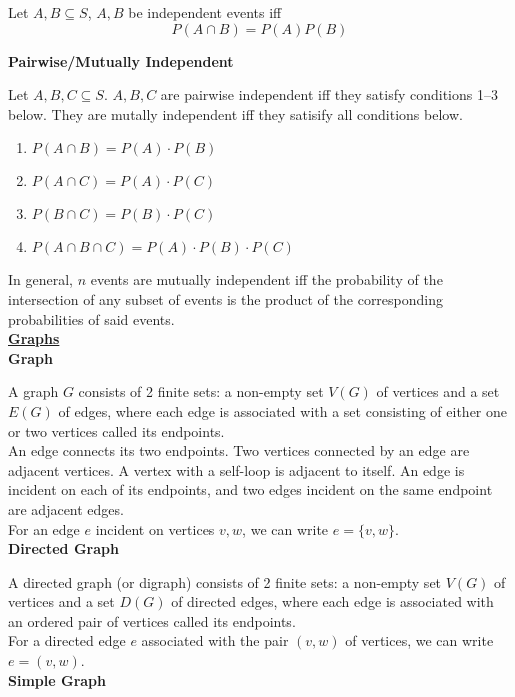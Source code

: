 \documentclass[a4paper]{article}
\newcommand{\heading}[1]{{\small\underline{\textbf{#1}}}}
\newcommand{\subheading}[1]{{\scriptsize\textbf{#1}}}
\begin{document}
\begin{multicols*}{4}
Let $A, B \subseteq S$, $A, B$ be independent events iff 
$$P(A \cap B) = P(A)P(B)$$

\subheading{Pairwise/Mutually Independent}

Let $A, B, C \subseteq S$. $A, B, C$ are pairwise independent iff they satisfy
conditions 1--3 below. They are mutally independent iff they satisify all
conditions below.
\begin{enumerate} \itemsep -0.5em
  \item $P(A \cap B) = P(A) \cdot P(B)$
  \item $P(A \cap C) = P(A) \cdot P(C)$
  \item $P(B \cap C) = P(B) \cdot P(C)$
  \item $P(A \cap B \cap C) = P(A) \cdot P(B) \cdot P(C)$
\end{enumerate}
In general, $n$ events are mutually independent iff the probability of the
intersection of any subset of events is the product of the corresponding
probabilities of said events.\\

\heading{Graphs}\\

\subheading{Graph}

A graph $G$ consists of 2 finite sets: a non-empty set $V(G)$ of vertices and a
set $E(G)$ of edges, where each edge is associated with a set consisting of
either one or two vertices called its endpoints.\\

An edge connects its two endpoints. Two vertices connected by an edge are
adjacent vertices. A vertex with a self-loop is adjacent to itself. An edge is
incident on each of its endpoints, and two edges incident on the same endpoint
are adjacent edges.\\

For an edge $e$ incident on vertices $v, w$, we can write $e = \{v, w\}$.\\

\subheading{Directed Graph}

A directed graph (or digraph) consists of 2 finite sets: a non-empty set $V(G)$
of vertices and a set $D(G)$ of directed edges, where each edge is associated
with an ordered pair of vertices called its endpoints.\\

For a directed edge $e$ associated with the pair $(v, w)$ of vertices, we can
write $e = (v, w)$.\\

\subheading{Simple Graph}


\end{multicols*}
\end{document}
